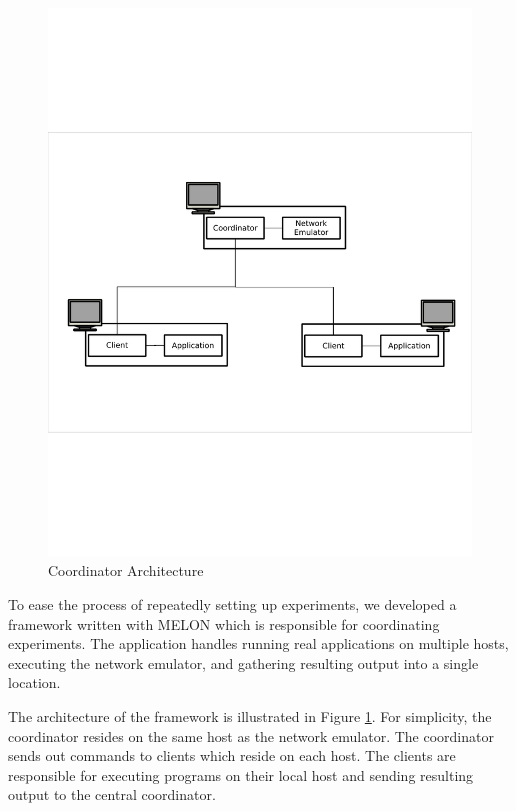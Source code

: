 \documentclass[lnicst]{svmultln}
\begin{document}
\begin{figure}
\centering
\includegraphics[scale = .34, clip, trim = 94px 279px 24px 252px]{figures/experiment_arch.pdf}
\caption{Coordinator Architecture}
\label{fig:coordarchitecture}
\end{figure}

To ease the process of repeatedly setting up experiments, we developed a framework written with MELON which is responsible for coordinating experiments. The application handles running real applications on multiple hosts, executing the network emulator, and gathering resulting output into a single location.

The architecture of the framework is illustrated in Figure \ref{fig:coordarchitecture}. For simplicity, the coordinator resides on the same host as the network emulator. The coordinator sends out commands to clients which reside on each host. The clients are responsible for executing programs on their local host and sending resulting output to the central coordinator.
\end{document}
